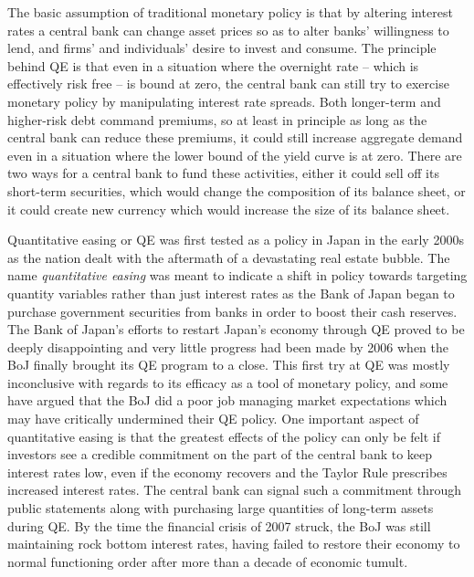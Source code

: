\documentclass[12pt]{report}
\begin{document}

The basic assumption of traditional monetary policy is that by altering interest rates a central bank can change asset prices so as to alter banks' willingness to lend, and firms' and individuals' desire to invest and consume.\autocite[51]{fawley2013four}
The principle behind QE is that even in a situation where the overnight rate -- which is effectively risk free -- is bound at zero, the central bank can still try to exercise monetary policy by manipulating interest rate spreads.\autocite[466]{blinder2010quantitative}
Both longer-term and higher-risk debt command premiums, so at least in principle as long as the central bank can reduce these premiums, it could still increase aggregate demand even in a situation where the lower bound of the yield curve is at zero.\autocite[466]{blinder2010quantitative}
There are two ways for a central bank to fund these activities, either it could sell off its short-term securities, which would change the composition of its balance sheet, or it could create new currency which would increase the size of its balance sheet.\autocite[467]{blinder2010quantitative}

Quantitative easing or QE was first tested as a policy in Japan in the early 2000s as the nation dealt with the aftermath of a devastating real estate bubble.\autocite[274]{joyce2012quantitative}
The name \emph{quantitative easing} was meant to indicate a shift in policy towards targeting quantity variables rather than just interest rates as the Bank of Japan began to purchase government securities from banks in order to boost their cash reserves.\autocite[274]{joyce2012quantitative}
The Bank of Japan's efforts to restart Japan's economy through QE proved to be deeply disappointing and very little progress had been made by 2006 when the BoJ finally brought its QE program to a close.\autocite[55]{fawley2013four}
This first try at QE was mostly inconclusive with regards to its efficacy as a tool of monetary policy, and some have argued that the BoJ did a poor job managing market expectations which may have critically undermined their QE policy.\autocite[55]{fawley2013four}
One important aspect of quantitative easing is that the greatest effects of the policy can only be felt if investors see a credible commitment on the part of the central bank to keep interest rates low, even if the economy recovers and the Taylor Rule prescribes increased interest rates.\autocite[4]{krishnamurthy2011effects}
The central bank can signal such a commitment through public statements along with purchasing large quantities of long-term assets during QE.\autocite[4]{krishnamurthy2011effects}
By the time the financial crisis of 2007 struck, the BoJ was still maintaining rock bottom interest rates, having failed to restore their economy to normal functioning order after more than a decade of economic tumult.\autocite[56]{fawley2013four}
\end{document}
